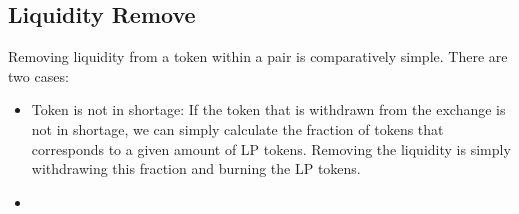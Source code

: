 \subsection{Liquidity Remove}
Removing liquidity from a token within a pair is comparatively simple. There are two cases:
\begin{itemize}
	\item Token is not in shortage: If the token that is withdrawn from the exchange is not in shortage, we can simply calculate the fraction of tokens that corresponds to a given amount of LP tokens. Removing the liquidity is simply withdrawing this fraction and burning the LP tokens.
	\item  
\end{itemize}